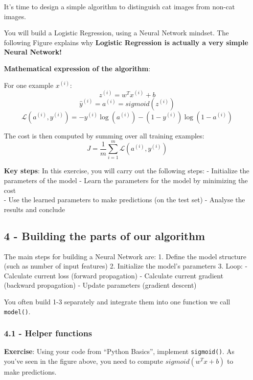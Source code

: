 \documentclass[11pt]{article}
\begin{document}
It's time to design a simple algorithm to distinguish cat images from
non-cat images.

You will build a Logistic Regression, using a Neural Network mindset.
The following Figure explains why \textbf{Logistic Regression is
actually a very simple Neural Network!}

\textbf{Mathematical expression of the algorithm}:

For one example \(x^{(i)}\): \[z^{(i)} = w^T x^{(i)} + b \tag{1}\]
\[\hat{y}^{(i)} = a^{(i)} = sigmoid(z^{(i)})\tag{2}\]
\[ \mathcal{L}(a^{(i)}, y^{(i)}) =  - y^{(i)}  \log(a^{(i)}) - (1-y^{(i)} )  \log(1-a^{(i)})\tag{3}\]

The cost is then computed by summing over all training examples:
\[ J = \frac{1}{m} \sum_{i=1}^m \mathcal{L}(a^{(i)}, y^{(i)})\tag{6}\]

\textbf{Key steps}: In this exercise, you will carry out the following
steps: - Initialize the parameters of the model - Learn the parameters
for the model by minimizing the cost\\
- Use the learned parameters to make predictions (on the test set) -
Analyse the results and conclude

    \hypertarget{building-the-parts-of-our-algorithm}{%
\subsection{4 - Building the parts of our
algorithm}\label{building-the-parts-of-our-algorithm}}

The main steps for building a Neural Network are: 1. Define the model
structure (such as number of input features) 2. Initialize the model's
parameters 3. Loop: - Calculate current loss (forward propagation) -
Calculate current gradient (backward propagation) - Update parameters
(gradient descent)

You often build 1-3 separately and integrate them into one function we
call \texttt{model()}.

\hypertarget{helper-functions}{%
\subsubsection{4.1 - Helper functions}\label{helper-functions}}

\textbf{Exercise}: Using your code from ``Python Basics'', implement
\texttt{sigmoid()}. As you've seen in the figure above, you need to
compute \(sigmoid( w^T x + b)\) to make predictions.
\end{document}
